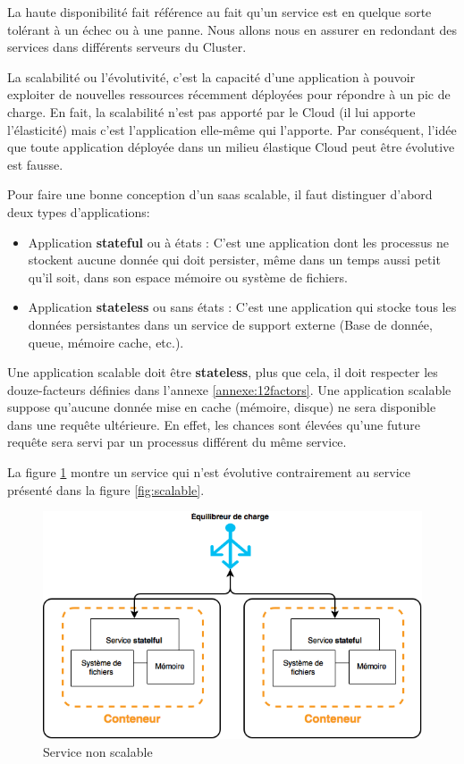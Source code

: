 \begin{onehalfspace}
La haute disponibilité fait référence au fait qu'un service est en quelque sorte tolérant à un échec ou à une panne. Nous allons nous en assurer en redondant des services dans différents serveurs du Cluster.

La scalabilité ou l'évolutivité, c'est la capacité d'une application à pouvoir exploiter de nouvelles ressources récemment déployées pour répondre à un pic de charge. En fait, la scalabilité n'est pas apporté par le Cloud (il lui apporte l'élasticité) mais c'est l'application elle-même qui l'apporte. Par conséquent, l'idée que toute application déployée dans un milieu élastique Cloud peut être évolutive est fausse.


Pour faire une bonne conception d'un \acrshort{saas} scalable, il faut distinguer d'abord deux types d'applications:

\begin{itemize}
	\item Application \textbf{stateful} ou à états : C'est une application dont les processus ne stockent aucune donnée qui doit persister, même dans un temps aussi petit qu'il soit, dans son espace mémoire ou système de fichiers.
	\item Application \textbf{stateless} ou sans états : C'est une application qui stocke tous les données persistantes dans un service de support externe (Base de donnée, queue, mémoire cache, etc.).
\end{itemize}

Une application scalable doit être \textbf{stateless}, plus que cela, il doit respecter les douze-facteurs définies dans l'annexe \ref{annexe:12factors}. Une application scalable suppose qu'aucune donnée mise en cache (mémoire, disque) ne sera disponible dans une requête ultérieure. En effet, les chances sont élevées qu'une future requête sera servi par un processus différent du même service.


La figure \ref{fig:non-scalable} montre un service qui n'est évolutive contrairement au service présenté dans la figure \ref{fig:scalable}.


\begin{figure}[H]
\centering
\includegraphics [scale=0.5]{chapitre4/assets/stateful}
\caption{Service non scalable}
\label{fig:non-scalable}
\end{figure}


\end{onehalfspace}
